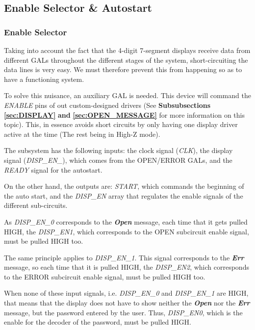 \subsection{Enable Selector \& Autostart}
\label{sec:ENABLE_AUTOSTART}

\subsubsection{Enable Selector}
\label{sec:ENABLE_SEL}

Taking into account the fact that the 4-digit 7-segment displays receive data from different GALs throughout the different stages of the system, short-circuiting the data lines is very easy. We must therefore prevent this from happening so as to have a functioning system.\medskip

To solve this nuisance, an auxiliary GAL is needed. This device will command the \textit{ENABLE} pins of out custom-designed drivers (See \textbf{Subsubsections \ref{sec:DISPLAY}} \textbf{and} \textbf{\ref{sec:OPEN_MESSAGE}} for more information on this topic). This, in essence avoids short circuits by only having one display driver active at the time (The rest being in High-Z mode).

\medskip

The subsystem has the following inputs: the clock signal (\textit{CLK}), the display signal (\textit{DISP\_EN\_}), which comes from the OPEN/ERROR GALs, and the \textit{READY} signal for the autostart. \medskip

On the other hand, the outputs are: \textit{START}, which commands the beginning of the auto start, and the \textit{DISP\_EN} array that regulates the enable signals of the different sub-circuits.\medskip

As \textit{DISP\_EN\_0} corresponds to the \textbf{\textit{Open}} message, each time that it gets pulled HIGH, the \textit{DISP\_EN1}, which corresponds to the OPEN subcircuit enable signal, must be pulled HIGH too.\medskip

The same principle applies to \textit{DISP\_EN\_1}. This signal corresponds to the \textbf{\textit{Err}} message, so each time that it is pulled HIGH, the \textit{DISP\_EN2}, which corresponds to the ERROR subcircuit enable signal, must be pulled HIGH too.

\medskip

When none of these input signals, i.e. \textit{DISP\_EN\_0} and \textit{DISP\_EN\_1} are HIGH, that means that the display does not have to show neither the \textbf{\textit{Open}} nor the \textbf{\textit{Err}} message, but the password entered by the user. Thus, \textit{DISP\_EN0}, which is the enable for the decoder of the password, must be pulled HIGH.\medskip


